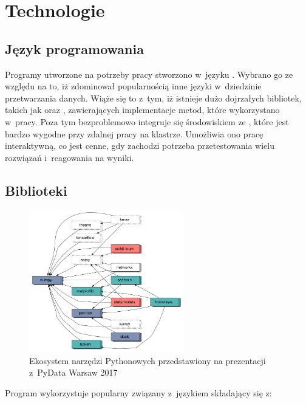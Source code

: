\section{Technologie}\label{sec:technologie}

\subsection{Język programowania}

Programy utworzone na potrzeby pracy stworzono w~języku . Wybrano go
ze względu na to, iż zdominował popularnością inne języki w~dziedzinie przetwarzania danych.
Wiąże się to z~tym, iż istnieje dużo dojrzałych bibliotek, takich jak 
oraz , zawierających implementacje metod, które wykorzystano w~pracy.
Poza tym bezproblemowo integruje się środowiskiem ze , które jest bardzo wygodne przy
zdalnej pracy na klastrze. Umożliwia ono pracę interaktywną, co jest cenne, gdy zachodzi
potrzeba przetestowania wielu rozwiązań i~reagowania na wyniki.

\subsection{Biblioteki}

\begin{figure}[H]
    \centering
    \includegraphics[width=0.6\textwidth]{images/3_3_ecosystem}
    \caption{Ekosystem narzędzi Pythonowych przedstawiony na prezentacji z~PyData Warsaw 2017\cite{thePythonEcosystem}}
    \label{fig:3_3_ecosystem}
\end{figure}

Program wykorzystuje popularny  związany z~językiem  składający się z:

